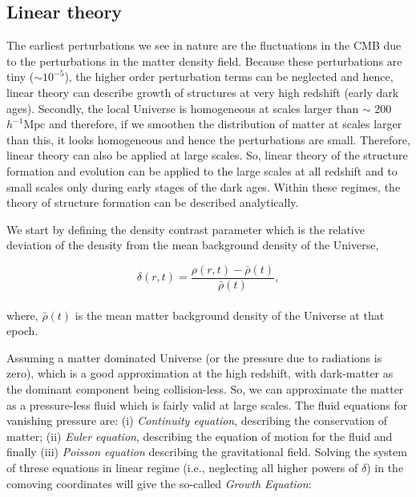 \subsection{Linear theory}

The earliest perturbations we see in nature are the fluctuations in the
CMB due to the perturbations in the matter density
field. Because these perturbations are tiny ($\sim 10^{-5}$), 
the higher order perturbation
terms can be neglected and hence, linear theory can describe growth of structures
at very high redshift (early dark ages). 
Secondly, the local Universe is homogeneous at scales larger than
$\sim$ 200 $h^{-1} \mathrm{Mpc}$ and therefore, if we smoothen the distribution
of matter at scales larger than this, it looks homogeneous and hence the perturbations
are small. Therefore, linear theory can also be applied at large scales. 
So, linear theory of the structure formation and evolution can be applied
to the large scales at all redshift and to small scales only during
early stages of the dark ages. 
Within these regimes, the theory of structure formation can be
described analytically.

We start by defining the density contrast parameter which is the relative 
deviation of the density from the mean background density of the Universe,

\begin{equation}
	\delta(r,t) = \dfrac{\rho(r,t) - \bar{\rho}(t)}{\bar{\rho}(t)},
\end{equation}
\\
where, $\bar{\rho}(t)$ is the mean matter background density 
of the Universe at that epoch. 

Assuming a matter dominated Universe (or the pressure due to radiations
is zero), which is a good approximation at the
high redshift, with dark-matter as the dominant component being collision-less. 
So, we can approximate the matter as a pressure-less fluid which is fairly 
valid at large scales. The fluid equations for vanishing pressure are: 
(i) {\it Continuity equation}, describing the conservation of matter; (ii) {\it Euler
equation}, describing the equation of motion for the fluid and finally (iii) 
{\it Poisson equation} describing the gravitational field. Solving the system of threse
equations in linear regime (i.e., neglecting all higher powers of $\delta$) in 
the comoving coordinates will give
the so-called {\it Growth Equation}:

